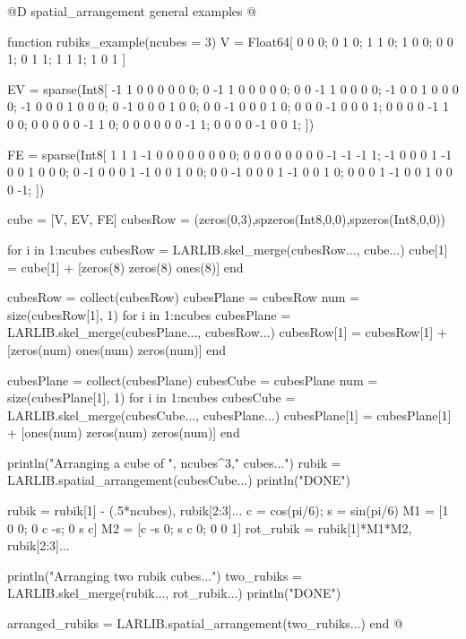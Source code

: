 @D spatial\_arrangement general examples
@{function rubiks_example(ncubes = 3)
    V = Float64[
        0 0 0; 0 1 0;
        1 1 0; 1 0 0;
        0 0 1; 0 1 1;
        1 1 1; 1 0 1
    ]

    EV = sparse(Int8[
        -1  1  0  0  0  0  0  0;
        0 -1  1  0  0  0  0  0;
        0  0 -1  1  0  0  0  0;
        -1  0  0  1  0  0  0  0;
        -1  0  0  0  1  0  0  0;
        0 -1  0  0  0  1  0  0;
        0  0 -1  0  0  0  1  0;
        0  0  0 -1  0  0  0  1;
        0  0  0  0 -1  1  0  0;
        0  0  0  0  0 -1  1  0;
        0  0  0  0  0  0 -1  1;
        0  0  0  0 -1  0  0  1;
    ])

    FE = sparse(Int8[
        1  1  1 -1  0  0  0  0  0  0  0  0;
        0  0  0  0  0  0  0  0 -1 -1 -1  1;
        -1  0  0  0  1 -1  0  0  1  0  0  0;
        0 -1  0  0  0  1 -1  0  0  1  0  0;
        0  0 -1  0  0  0  1 -1  0  0  1  0;
        0  0  0  1 -1  0  0  1  0  0  0 -1;
    ])

    cube = [V, EV, FE]
    cubesRow = (zeros(0,3),spzeros(Int8,0,0),spzeros(Int8,0,0))

    for i in 1:ncubes
        cubesRow = LARLIB.skel_merge(cubesRow..., cube...)
        cube[1] = cube[1] + [zeros(8) zeros(8) ones(8)]
    end

    cubesRow = collect(cubesRow)
    cubesPlane = cubesRow
    num = size(cubesRow[1], 1)
    for i in 1:ncubes
        cubesPlane = LARLIB.skel_merge(cubesPlane..., cubesRow...)
        cubesRow[1] = cubesRow[1] + [zeros(num) ones(num) zeros(num)]
    end

    cubesPlane = collect(cubesPlane)
    cubesCube = cubesPlane
    num = size(cubesPlane[1], 1)
    for i in 1:ncubes
        cubesCube = LARLIB.skel_merge(cubesCube..., cubesPlane...)
        cubesPlane[1] = cubesPlane[1] + [ones(num) zeros(num) zeros(num)]
    end

    println("Arranging a cube of ", ncubes^3," cubes...")
    rubik = LARLIB.spatial_arrangement(cubesCube...)
    println("DONE")

    rubik = rubik[1] - (.5*ncubes), rubik[2:3]...
    c = cos(pi/6); s = sin(pi/6)
    M1 = [1  0 0; 0 c -s; 0 s c]
    M2 = [c -s 0; s c  0; 0 0 1]
    rot_rubik = rubik[1]*M1*M2, rubik[2:3]...

    println("Arranging two rubik cubes...")
    two_rubiks = LARLIB.skel_merge(rubik..., rot_rubik...)
    println("DONE")

    arranged_rubiks = LARLIB.spatial_arrangement(two_rubiks...)
end
@}

